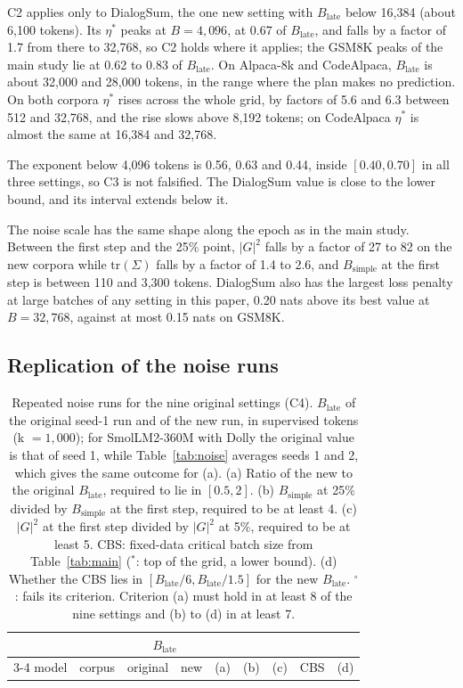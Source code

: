\documentclass[10pt]{article}
\newcommand{\bsimple}{B_{\mathrm{simple}}}
\newcommand{\blate}{B_{\mathrm{late}}}
\begin{document}
C2 applies only to DialogSum, the one new setting with $\blate$ below 16,384 (about 6,100 tokens). Its $\eta^*$ peaks at $B = 4{,}096$, at 0.67 of $\blate$, and falls by a factor of 1.7 from there to 32,768, so C2 holds where it applies; the GSM8K peaks of the main study lie at 0.62 to 0.83 of $\blate$. On Alpaca-8k and CodeAlpaca, $\blate$ is about 32,000 and 28,000 tokens, in the range where the plan makes no prediction. On both corpora $\eta^*$ rises across the whole grid, by factors of 5.6 and 6.3 between 512 and 32,768, and the rise slows above 8,192 tokens; on CodeAlpaca $\eta^*$ is almost the same at 16,384 and 32,768.

The exponent below 4,096 tokens is 0.56, 0.63 and 0.44, inside $[0.40, 0.70]$ in all three settings, so C3 is not falsified. The DialogSum value is close to the lower bound, and its interval extends below it.

The noise scale has the same shape along the epoch as in the main study. Between the first step and the 25\% point, $|G|^2$ falls by a factor of 27 to 82 on the new corpora while $\mathrm{tr}(\Sigma)$ falls by a factor of 1.4 to 2.6, and $\bsimple$ at the first step is between 110 and 3,300 tokens. DialogSum also has the largest loss penalty at large batches of any setting in this paper, 0.20 nats above its best value at $B = 32{,}768$, against at most 0.15 nats on GSM8K.

\subsection{Replication of the noise runs}

\begin{table}[t]
\centering
\caption{Repeated noise runs for the nine original settings (C4). $\blate$ of the original seed-1 run and of the new run, in supervised tokens (k $=1{,}000$); for SmolLM2-360M with Dolly the original value is that of seed 1, while Table~\ref{tab:noise} averages seeds 1 and 2, which gives the same outcome for (a). (a) Ratio of the new to the original $\blate$, required to lie in $[0.5, 2]$. (b) $\bsimple$ at 25\% divided by $\bsimple$ at the first step, required to be at least 4. (c) $|G|^2$ at the first step divided by $|G|^2$ at 5\%, required to be at least 5. CBS: fixed-data critical batch size from Table~\ref{tab:main} ($^{*}$: top of the grid, a lower bound). (d) Whether the CBS lies in $[\blate/6, \blate/1.5]$ for the new $\blate$. $^{\circ}$: fails its criterion. Criterion (a) must hold in at least 8 of the nine settings and (b) to (d) in at least 7.}
\label{tab:confirm-rep}
\small
\begin{tabular}{llrrrrrrc}
\toprule
 & & \multicolumn{2}{c}{$\blate$} & & & & & \\
\cmidrule(lr){3-4}
model & corpus & original & new & (a) & (b) & (c) & CBS & (d) \\
\midrule

\end{tabular}
\end{table}
\end{document}

